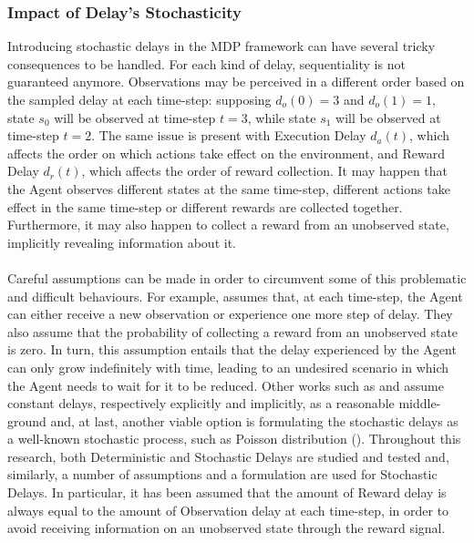             \subsubsection{Impact of Delay's Stochasticity}
            Introducing stochastic delays in the MDP framework can have several tricky consequences to be handled. For each kind of delay, sequentiality is not guaranteed anymore. Observations may be perceived in a different order based on the sampled delay at each time-step: supposing $d_o(0) = 3$ and $d_o(1) = 1$, state $s_0$ will be observed at time-step $t=3$, while state $s_1$ will be observed at time-step $t=2$. The same issue is present with Execution Delay $d_a(t)$, which affects the order on which actions take effect on the environment, and Reward Delay $d_r(t)$, which affects the order of reward collection. It may happen that the Agent observes different states at the same time-step, different actions take effect in the same time-step or different rewards are collected together. Furthermore, it may also happen to collect a reward from an unobserved state, implicitly revealing information about it. \\\\
            Careful assumptions can be made in order to circumvent some of this problematic and difficult behaviours. For example,  assumes that, at each time-step, the Agent can either receive a new observation or experience one more step of delay. They also assume that the probability of collecting a reward from an unobserved state is zero. In turn, this assumption entails that the delay experienced by the Agent can only grow indefinitely with time, leading to an undesired scenario in which the Agent needs to wait for it to be reduced. Other works such as  and  assume constant delays, respectively explicitly and implicitly, as a reasonable middle-ground and, at last, another viable option is formulating the stochastic delays as a well-known stochastic process, such as Poisson distribution (). \newline
            Throughout this research, both Deterministic and Stochastic Delays are studied and tested and, similarly, a number of assumptions and a formulation are used for Stochastic Delays. In particular, it has been assumed that the amount of Reward delay is always equal to the amount of Observation delay at each time-step, in order to avoid receiving information on an unobserved state through the reward signal.
        
